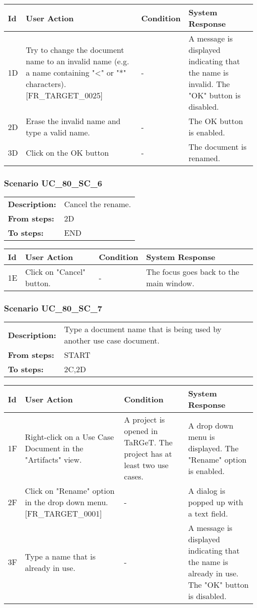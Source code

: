 \documentclass[a4paper,11pt]{article}
\newcommand{\bl}{\\ \hline}
\begin{document}
\begin{tabular}{|p{0.8in}|p{1.6in}|p{1.6in}|p{1.6in}|}
\hline
Id & User Action & Condition & System Response  \bl 
1D & Try to change the document name to an invalid name (e.g. a name containing "<" or "*" characters). [FR_TARGET_0025] & - & A message is displayed indicating that the name is invalid. The "OK" button is disabled. \bl 
2D & Erase the invalid name and type a valid name. & - & The OK button is enabled. \bl 
3D & Click on the OK button & - & The document is renamed. \bl 
\end{tabular}
\subsubsection*{Scenario UC_80_SC_6}
\begin{tabular}{p{1in}p{4in}}
{\bf Description:} & Cancel the rename. \\
{\bf From steps:} & 2D \\
{\bf To steps:} & END \\
\end{tabular}
 
\begin{tabular}{|p{0.8in}|p{1.6in}|p{1.6in}|p{1.6in}|}
\hline
Id & User Action & Condition & System Response  \bl 
1E & Click on "Cancel" button. & - & The focus goes back to the main window. \bl 
\end{tabular}
\subsubsection*{Scenario UC_80_SC_7}
\begin{tabular}{p{1in}p{4in}}
{\bf Description:} & Type a document name that is being used by another use case document. \\
{\bf From steps:} & START \\
{\bf To steps:} & 2C,2D \\
\end{tabular}
 
\begin{tabular}{|p{0.8in}|p{1.6in}|p{1.6in}|p{1.6in}|}
\hline
Id & User Action & Condition & System Response  \bl 
1F & Right-click on a Use Case Document in the "Artifacts" view. & A project is opened in TaRGeT. The project has at least two use cases. & A drop down menu is displayed. The "Rename" option is enabled. \bl 
2F & Click on "Rename" option in the drop down menu. [FR_TARGET_0001] & - & A dialog is popped up with a text field. \bl 
3F & Type a name that is already in use. & - & A message is displayed indicating that the name is already in use. The "OK" button is disabled. \bl 
\end{tabular}
\end{document}
